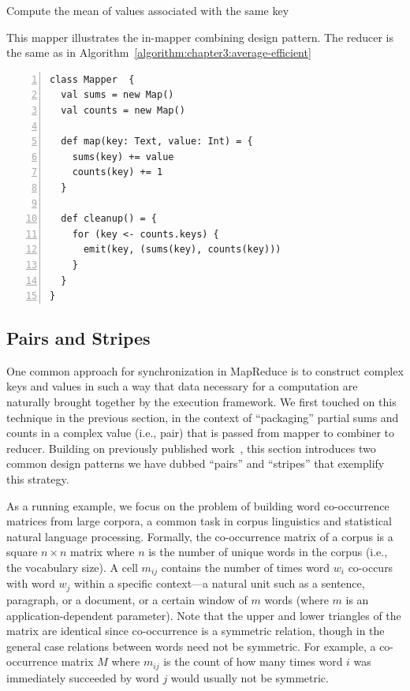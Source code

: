 \documentclass[11pt]{article}
\begin{document}
\begin{algorithm}[t]
\caption{Compute the mean of values associated with the same key}
\label{algorithm:chapter3:average-more-efficient}
This mapper illustrates the in-mapper combining design pattern. The
reducer is the same as in
Algorithm~\ref{algorithm:chapter3:average-efficient}
\begin{small}
\begin{Verbatim}[numbers=left, xleftmargin=7.5mm]
class Mapper  {
  val sums = new Map()
  val counts = new Map()

  def map(key: Text, value: Int) = {
    sums(key) += value
    counts(key) += 1
  }

  def cleanup() = {
    for (key <- counts.keys) {
      emit(key, (sums(key), counts(key)))
    }
  }
}
\end{Verbatim}
\end{small}
\end{algorithm}

\subsection{Pairs and Stripes}
\label{chapter3:pairs-and-stripes}

One common approach for synchronization in MapReduce is to construct
complex keys and values in such a way that data necessary for a
computation are naturally brought together by the execution framework.
We first touched on this technique in the previous section, in the
context of ``packaging'' partial sums and counts in a complex value
(i.e., pair) that is passed from mapper to combiner to reducer.
Building on previously published
work~\cite{Dyer_etal_2008,Lin_EMNLP2008}, this section introduces two
common design patterns we have dubbed ``pairs'' and ``stripes'' that
exemplify this strategy.

As a running example, we focus on the problem of building word
co-occurrence matrices from large corpora, a common task in corpus
linguistics and statistical natural language processing.  Formally,
the co-occurrence matrix of a corpus is a square $n \times n$ matrix
where $n$ is the number of unique words in the corpus
(i.e., the vocabulary size).  A cell $m_{ij}$ contains the number of
times word $w_i$ co-occurs with word $w_j$ within a specific
context---a natural unit such as a sentence, paragraph, or a document,
or a certain window of $m$ words (where $m$ is an
application-dependent parameter).  Note that the upper and lower
triangles of the matrix are identical since co-occurrence is a
symmetric relation, though in the general case relations between words
need not be symmetric.  For example, a co-occurrence matrix $M$ where
$m_{ij}$ is the count of how many times word $i$ was immediately
succeeded by word $j$ would usually not be symmetric.
\end{document}

